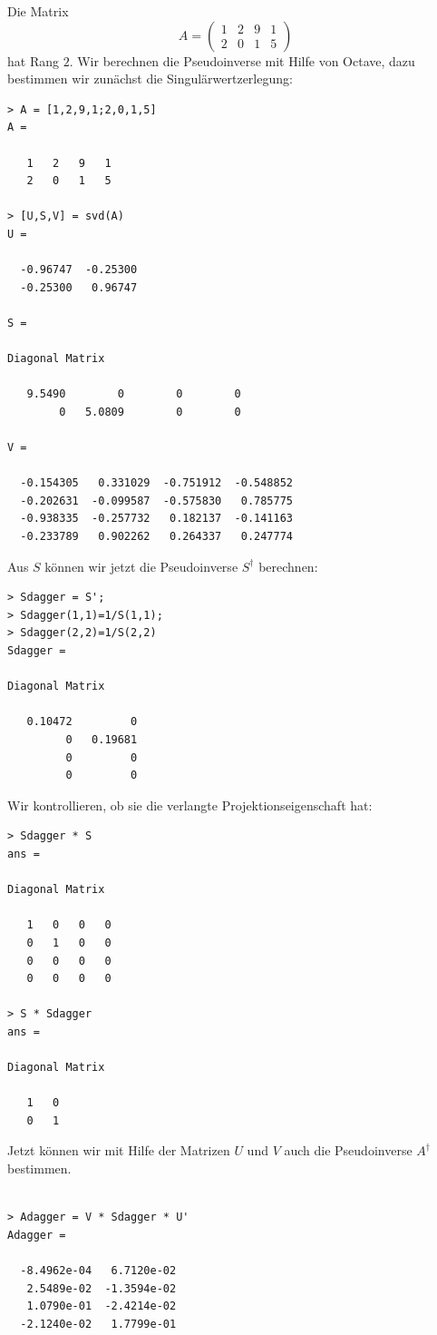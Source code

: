 \begin{beispiel}
Die Matrix
\[
A=\begin{pmatrix}
1&2&9&1\\
2&0&1&5
\end{pmatrix}
\]
hat Rang $2$.
Wir berechnen die Pseudoinverse mit Hilfe von Octave, dazu bestimmen wir
zunächst die Singulärwertzerlegung:
\begin{verbatim}
> A = [1,2,9,1;2,0,1,5]
A =

   1   2   9   1
   2   0   1   5

> [U,S,V] = svd(A)
U =

  -0.96747  -0.25300
  -0.25300   0.96747

S =

Diagonal Matrix

   9.5490        0        0        0
        0   5.0809        0        0

V =

  -0.154305   0.331029  -0.751912  -0.548852
  -0.202631  -0.099587  -0.575830   0.785775
  -0.938335  -0.257732   0.182137  -0.141163
  -0.233789   0.902262   0.264337   0.247774
\end{verbatim}
Aus $S$ können wir jetzt die Pseudoinverse $S^\dagger$ berechnen:
\begin{verbatim}
> Sdagger = S';
> Sdagger(1,1)=1/S(1,1);
> Sdagger(2,2)=1/S(2,2)
Sdagger =

Diagonal Matrix

   0.10472         0
         0   0.19681
         0         0
         0         0
\end{verbatim}
Wir kontrollieren, ob sie die verlangte Projektionseigenschaft hat:
\begin{verbatim}
> Sdagger * S
ans =

Diagonal Matrix

   1   0   0   0
   0   1   0   0
   0   0   0   0
   0   0   0   0

> S * Sdagger
ans =

Diagonal Matrix

   1   0
   0   1
\end{verbatim}
Jetzt können wir mit Hilfe der Matrizen $U$ und $V$ auch die Pseudoinverse
$A^\dagger$ bestimmen.
\begin{verbatim}

> Adagger = V * Sdagger * U'
Adagger =

  -8.4962e-04   6.7120e-02
   2.5489e-02  -1.3594e-02
   1.0790e-01  -2.4214e-02
  -2.1240e-02   1.7799e-01


\end{verbatim}
\end{beispiel}
